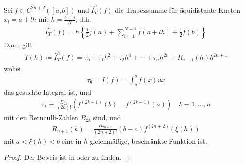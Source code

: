 \begin{Satze}
  Sei $f\in C^{2n+2}([a,b])$ und 
  $\hat{I}_T^h(f)$ die Trapezsumme
  für äquidistante Knoten $x_l=a+lh$
  mit $h=\frac{b-a}{N}$, d.h.
  \begin{gather}
    \hat{I}_T^h(f) = h\left\{
      \frac{1}{2}f(a) + \sum_{i=1}^{N-1}f(a+lh) +
      \frac{1}{2}f(b)
    \right\}
    \label{VII.3.1}
  \end{gather}
  Dann gilt
  \begin{gather}
    T(h) \coloneqq \hat{I}_T^h(f) = \tau_0+\tau_1h^2+\tau_2h^4
    +\dotsb + \tau_nh^{2n}+ R_{n+1}(h)h^{2n+1}
  \end{gather}
  wobei
  \begin{gather}
    \tau_0 = I(f) = \int_a^bf(x)\dd x
    \label{VII.3.3}
  \end{gather}
  das gesuchte Integral ist, und
  \begin{gather*}
    \tau_k = \frac{B_{2k}}{(2k)!}
    \left(f^{(2k-1)}(b)-f^{(2k-1)}(a)\right)
    \quad k=1,\dotsc, n
  \end{gather*}
  mit den Bernoulli-Zahlen $B_{2k}$ sind, und
  \begin{gather*}
    R_{n+1}(h) =
    \frac{B_{2n+2}}{(2n+2)!}(b-a)f^{(2n+2)}(\xi(h))
  \end{gather*}
  mit $a<\xi(h)<b$ eine in $h$
  gleichmäßige, beschränkte Funktion
  ist.

  \begin{proof}
    Der Beweis ist in
    \cite{stoerbulirsch} 
    oder \cite{haemmerlinhoffmann} zu finden.
  \end{proof}
\end{Satze}


